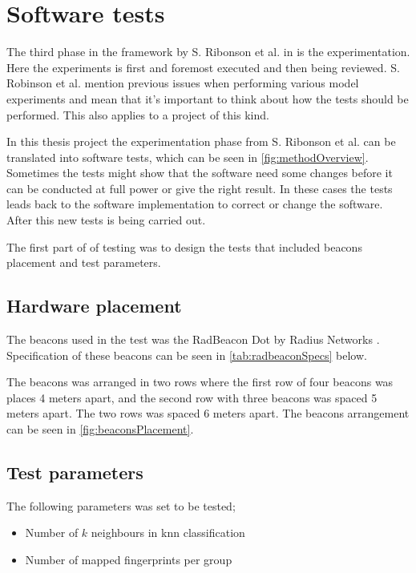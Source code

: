 \section{Software tests}\label{sec:methodSoftwareTests}
The third phase in the framework by S. Ribonson et al. in \cite{SecretsSuccessfulSimulation1995} is the experimentation.
Here the experiments is first and foremost executed and then being reviewed.
S. Robinson et al. mention previous issues when performing various model experiments and mean that it's important to think about how the tests should be performed.
This also applies to a project of this kind.

\bigskip

In this thesis project the experimentation phase from S. Ribonson et al. can be translated into software tests, which can be seen in \cref{fig:methodOverview}.
Sometimes the tests might show that the software need some changes before it can be conducted at full power or give the right result.
In these cases the tests leads back to the software implementation to correct or change the software.
After this new tests is being carried out.

\bigskip

The first part of of testing was to design the tests that included beacons placement and test parameters.


\subsection{Hardware placement}\label{sec:methodTestHardware}
The beacons used in the test was the RadBeacon Dot by Radius Networks \cite{RadBeaconDotDatasheet}.
Specification of these beacons can be seen in \cref{tab:radbeaconSpecs} below.


\bigskip

The beacons was arranged in two rows where the first row of four beacons was places 4 meters apart,  and the second row with three beacons was spaced 5 meters apart.
The two rows was spaced 6 meters apart.
The beacons arrangement can be seen in \cref{fig:beaconsPlacement}.



\subsection{Test parameters}\label{sec:methodTestParameters}
The following parameters was set to be tested;

\begin{itemize}
\item Number of $k$ neighbours in \acrshort{knn} classification
\item Number of mapped fingerprints per group
\end{itemize}

